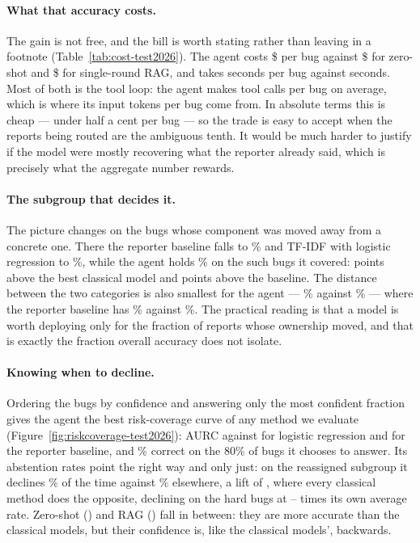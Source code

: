 \documentclass[sigconf,anonymous]{acmart}
\begin{document}
\paragraph{What that accuracy costs.}
The gain is not free, and the bill is worth stating rather than leaving in a footnote
(Table~\ref{tab:cost-test2026}). The agent costs \$\nAgentUsd{} per bug against \$\nZSUsd{} for
zero-shot and \$\nRagUsd{} for single-round RAG, and takes \nAgentLat{} seconds per bug against
\nZSLat{} seconds. Most of both is the tool loop: the agent makes \nAgentCalls{} tool calls per bug
on average, which is where its \nAgentInTok{} input tokens per bug come from. In absolute terms this
is cheap --- under half a cent per bug --- so the trade is easy to accept when the reports being
routed are the ambiguous tenth. It would be much harder to justify if the model were mostly
recovering what the reporter already said, which is precisely what the aggregate number rewards.

\paragraph{The subgroup that decides it.}
The picture changes on the bugs whose component was moved away from a concrete one. There the
reporter baseline falls to \nRepSpecAcc\% and TF-IDF with logistic regression to \nLrSpecAcc\%,
while the agent holds \nAgentSpecAcc\% on the \nAgentSpecN{} such bugs it covered:
\nAgentSpecOverLr{} points above the best classical model and \nAgentSpecOverRep{} points above the
baseline. The distance between the two categories is also smallest for the agent ---
\nAgentNeverAcc\% against \nAgentSpecAcc\% --- where the reporter baseline has
\nRepNeverAcc\% against \nRepSpecAcc\%. The practical reading is that a model is worth deploying
only for the fraction of reports whose ownership moved, and that is exactly the fraction overall
accuracy does not isolate.




\paragraph{Knowing when to decline.}
Ordering the bugs by confidence and answering only the most confident fraction gives the agent the
best risk-coverage curve of any method we evaluate (Figure~\ref{fig:riskcoverage-test2026}): AURC
\nAgentAurc{} against \nLrAurc{} for
logistic regression and \nRepAurc{} for the reporter baseline, and \nAgentCov\% correct on the 80\%
of bugs it chooses to answer. Its abstention rates point the right way and only just: on the
reassigned subgroup it declines \nAgentSpecAbst\% of the time against \nAgentNeverAbst\% elsewhere,
a lift of \nAgentLift, where every classical method does the opposite, declining on the hard bugs at
\nClassicalLiftMin--\nClassicalLiftMax{} times its own average rate. Zero-shot (\nZSLift) and RAG (\nRagLift) fall in between: they
are more accurate than the classical models, but their confidence is, like the classical models',
backwards.
\end{document}
